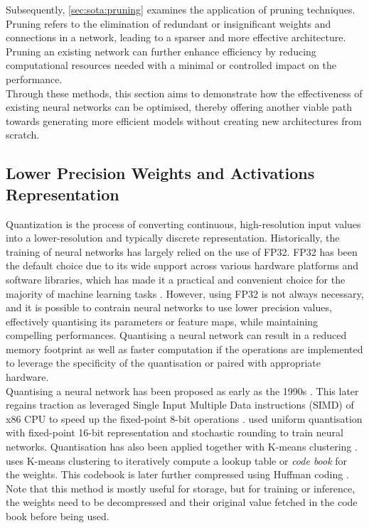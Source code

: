 Subsequently, \cref{sec:sota:pruning} examines the application of
pruning techniques. Pruning refers to the elimination of redundant or
insignificant weights and connections in a network, leading to a sparser and
more effective architecture. Pruning an existing network can further enhance
efficiency by reducing computational resources needed with a minimal or
controlled impact on the performance.\\

Through these methods, this section aims to demonstrate how the effectiveness of
existing neural networks can be optimised, thereby offering another viable path
towards generating more efficient models without creating new architectures from
scratch.\\

\subsection{Lower Precision Weights and Activations Representation}\label{sec:sota:quantisation}

Quantization is the process of converting continuous, high-resolution input
values into a lower-resolution and typically discrete representation.
Historically, the training of neural networks has largely relied on the use of
\ac{FP32}. FP32 has been the default choice due to its wide support across
various hardware platforms and software libraries, which has made it a practical
and convenient choice for the majority of machine learning tasks
\cite{sze2017efficient}. However, using \acl{FP32} is not always necessary, and
it is possible to contrain neural networks to use lower precision values,
effectively quantising its parameters or feature maps, while maintaining
compelling performances. Quantising a neural network can result in a reduced
memory footprint as well as faster computation if the operations are implemented
to leverage the specificity of the quantisation or paired with appropriate
hardware.\\

Quantising a neural network has been proposed as early as the 1990s
\cite{balzer1991weight,fiesler1990weight}. This later regains traction as
\citeauthor{37631} leveraged Single Input Multiple Data instructions (SIMD) of
x86 \ac{CPU} to speed up the fixed-point 8-bit operations \cite{37631}.
\citeauthor{gupta2015deep} \cite{gupta2015deep} used uniform quantisation with
fixed-point 16-bit representation and stochastic rounding to train neural
networks. Quantisation has also been applied together with K-means clustering
\cite{steinhaus1956division}. \cite{DBLP:journals/corr/HanMD15} uses K-means
clustering to iteratively compute a lookup table or \emph{code book} for the
weights. This codebook is later further compressed using Huffman coding
\cite{huffman1952method}. Note that this method is mostly useful for storage,
but for training or inference, the weights need to be decompressed and their
original value fetched in the code book before being used.\\

